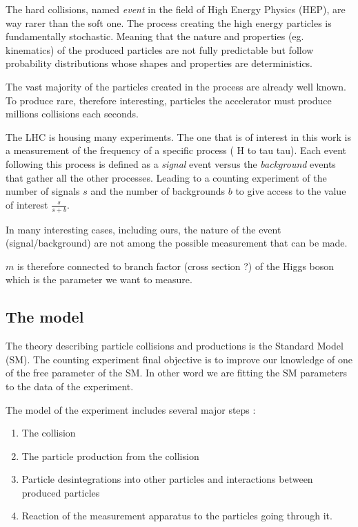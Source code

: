 The hard collisions, named \emph{event} in the field of High Energy Physics (HEP), are way rarer than the soft one.
The process creating the high energy particles is fundamentally stochastic.
Meaning that the nature and properties (eg. kinematics) of the produced particles are not fully predictable but follow
probability distributions whose shapes and properties are deterministics.

The vast majority of the particles created in the process are already well known.
To produce rare, therefore interesting, particles the accelerator must produce millions collisions each seconds.

The LHC is housing many experiments.
The one that is of interest in this work is a measurement of the frequency of a specific process ( H to tau tau).
Each event following this process is defined as a \emph{signal} event versus the \emph{background} events that gather all the other processes.
Leading to a counting experiment of the number of signals $s$ and the number of backgrounds $b$ to give access to the value of interest $\frac{s}{s + b}$.

In many interesting cases, including ours, the nature of the event (signal/background) are not among the possible measurement that can be made.


$m$ is therefore connected to branch factor (cross section ?) of the Higgs boson which is the parameter we want to measure.





\subsection{The model} %
\label{sub:the_model}

The theory describing particle collisions and productions is the Standard Model \needcite (SM).
The counting experiment final objective is to improve our knowledge of one of the free parameter of the SM.
In other word we are fitting the SM parameters to the data of the experiment.

The model of the experiment includes several major steps : 
\begin{enumerate}
	\item The collision
	\item The particle production from the collision
	\item Particle desintegrations into other particles and interactions between produced particles
	\item Reaction of the measurement apparatus to the particles going through it.
\end{enumerate}

